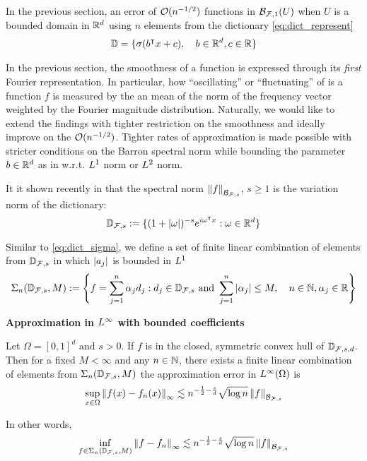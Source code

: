 In the previous section, an error of $\mathcal{O}(n^{-1/2})$ functions in
$\mathcal{B}_{\mathcal{F}, 1}(U)$ when $U$ is a bounded domain in $\mathbb{R}^d$ using $n$
elements from the dictionary \eqref{eq:dict_represent}
\begin{align}
    \mathbb{D} = \{
        \sigma(b{}^{\intercal} x + c), \quad b\in\mathbb{R}^d, c\in\mathbb{R}
    \}
\end{align}

In the previous section, the smoothness of a function is expressed through its
\textit{first} Fourier representation. In particular, how ``oscillating'' or
``fluctuating'' of is a function $f$ is measured by the an mean of the norm of
the frequency vector weighted by the Fourier magnitude distribution. Naturally,
we would like to extend the findings with tighter restriction on the smoothness
and ideally improve on the $\mathcal{O}(n^{-1/2})$. Tighter rates of approximation is
made possible with stricter conditions on the Barron spectral norm while
bounding the parameter $b\in\mathbb{R}^d$ as in w.r.t. $L^{1}$ norm or $L^{2}$
norm.

It it shown recently in \cite{siegelSharpBoundsApproximation2022} that the
spectral norm $\left\| f \right\|_{\mathcal{B}_{\mathcal{F}, s}}$, $s \geq 1$ is the variation
norm of the dictionary:
\begin{equation}
    \mathbb{D}_{\mathcal{F}, s} := \{
        (1 + \left| \omega \right|)^{-s} e^{i\omega{}^{\intercal} x}: \omega \in \mathbb{R}^d
    \}
\end{equation}

Similar to \eqref{eq:dict_sigma}, we define a set of finite linear combination
of elements from $\mathbb{D}_{\mathcal{F},s}$ in which $\left| a_j \right|$ is bounded in
$L^{1}$
\begin{equation}
    \Sigma_n(\mathbb{D}_{\mathcal{F}, s}, M) := \Bigg\{
        f = \sum_{j=1}^n \alpha_j d_j: 
        d_j \in \mathbb{D}_{\mathcal{F}, s} \textnormal{ and } 
        \sum_{j=1}^n \left| \alpha_j \right| \leq M, \quad 
        n \in \mathbb{N}, \alpha_j \in \mathbb{R}
    \Bigg\}
\end{equation}


\textbf{Approximation in $L^{\infty}$ with bounded coefficients}

\begin{theorem}
    Let $\Omega = [0,1]^d$ and $s > 0$. If $f$ is in the closed, symmetric
    convex hull of $\mathbb{D}_{\mathcal{F}, s, d}$. Then for a fixed $M<\infty$
    and any $n \in \mathbb{N}$, there exists a finite linear combination of elements
    from $\Sigma_n(\mathbb{D}_{\mathcal{F}, s}, M)$ the approximation error in
    $L^{\infty}(\Omega)$ is
    \begin{equation}
        \sup_{x\in \Omega} \left\| f(x)-f_n(x) \right\|_{\infty} \lesssim 
        n^{-\frac{1}{2}-\frac{s}{d}} \sqrt{\log{n}} \left\| f \right\|_{\mathcal{B}_{\mathcal{F},s}}
    \end{equation}

    In other words,
    \begin{equation}
        \inf_{f\in \Sigma_n(\mathbb{D}_{\mathcal{F}, s}, M)} 
        \left\| f-f_n \right\|_{\infty} \lesssim 
        n^{-\frac{1}{2}-\frac{s}{d}} \sqrt{\log{n}} \left\| f \right\|_{\mathcal{B}_{\mathcal{F},s}}
    \end{equation}
\end{theorem}

